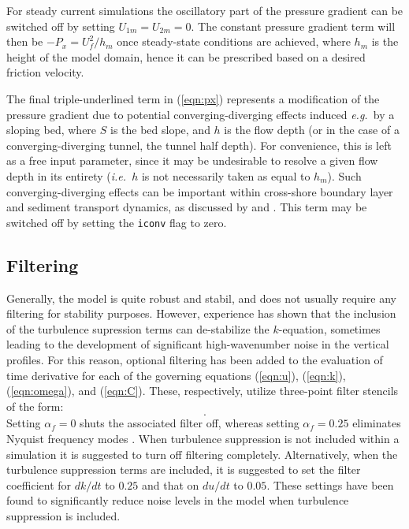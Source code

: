 \documentclass[12pt]{article}
\newcommand{\ie}{{\it i.e.\ }}
\newcommand{\eg}{{\it e.g.\ }}
\begin{document}
For steady current simulations the oscillatory part of the pressure
gradient can be switched off by setting $U_{1m}=U_{2m}=0$.  The
constant pressure gradient term will then be $-P_x=U_f^2/h_m$ once
steady-state conditions are achieved, where $h_m$ is the height of the
model domain, hence it can be prescribed based on a desired friction
velocity.

The final triple-underlined term in (\ref{eqn:px}) represents a
modification of the pressure gradient due to potential
converging-diverging effects induced \eg by a sloping bed, where $S$
is the bed slope, and $h$ is the flow depth (or in the case of a
converging-diverging tunnel, the tunnel half depth).  For convenience,
this is left as a free input parameter, since it may be undesirable to
resolve a given flow depth in its entirety (\ie $h$ is not necessarily
taken as equal to $h_m$).  Such converging-diverging effects can be
important within cross-shore boundary layer and sediment transport
dynamics, as discussed by \cite{Sumeretal1993} and
\cite{Fuhrmanetal2009a,Fuhrmanetal2009b}.  This term may be switched
off by setting the \texttt{iconv} flag to zero.


\subsection{Filtering}

Generally, the model is quite robust and stabil, and does not usually
require any filtering for stability purposes.  However, experience has
shown that the inclusion of the turbulence supression terms can
de-stabilize the $k$-equation, sometimes leading to the development of
significant high-wavenumber noise in the vertical profiles.  For this
reason, optional filtering has been added to the evaluation of time
derivative for each of the governing equations (\ref{eqn:u}),
(\ref{eqn:k}), (\ref{eqn:omega}), and (\ref{eqn:C}).  These,
respectively, utilize three-point filter stencils of the form:
%
\begin{equation}
[\alpha_f\hspace{1cm} 1-2\alpha_f\hspace{1cm} \alpha_f].
\end{equation}
%
Setting $\alpha_f=0$ shuts the associated filter off, whereas setting
$\alpha_f=0.25$ eliminates Nyquist frequency modes \cite[see
  \eg][p.~228]{AbbottMinns1998}.  When turbulence suppression is not
included within a simulation it is suggested to turn off filtering
completely.  Alternatively, when the turbulence suppression terms are
included, it is suggested to set the filter coefficient for $dk/dt$ to
$0.25$ and that on $du/dt$ to $0.05$.  These settings have been found
to significantly reduce noise levels in the model when turbulence
suppression is included.
\end{document}
